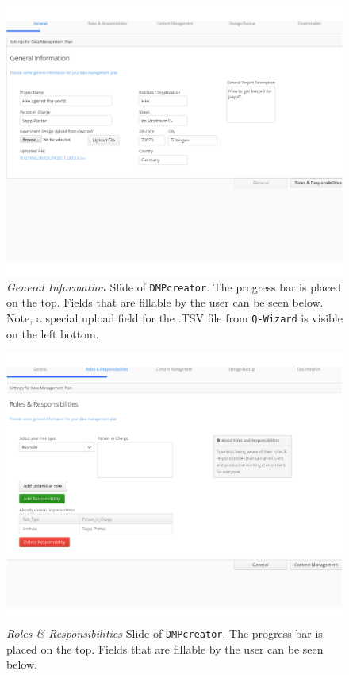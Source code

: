 \begin{landscape}
	\begin{figure}[]
		\centering
		\includegraphics[width=1.2\textwidth]{pictures/GeneralInformation.png}
		\caption{\textit{General Information} Slide of \texttt{DMPcreator}. The progress bar is placed on the top. Fields that are fillable by the user can be seen below. Note, a special upload field for the .TSV file from \texttt{Q-Wizard} is visible on the left bottom.}
		\label{GeneralInformationSlide}
	\end{figure}



\begin{figure}[]
	\centering
	\includegraphics[width=1.2\textwidth]{pictures/RolesResponsibilities.png}
	\caption{\textit{Roles \& Responsibilities} Slide of \texttt{DMPcreator}. The progress bar is placed on the top. Fields that are fillable by the user can be seen below.}
	\label{RolesResponsibilitiesSlide}
\end{figure}


\end{landscape}
